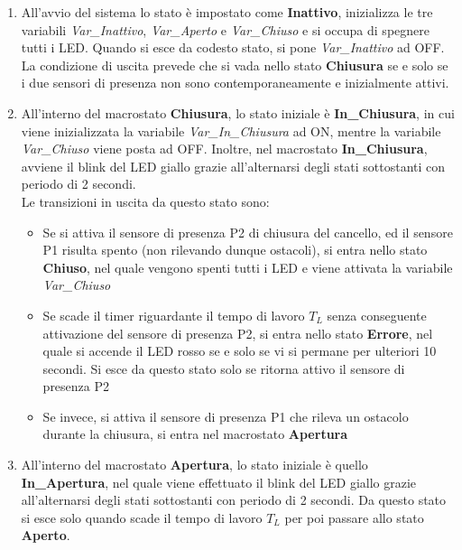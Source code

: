             \begin{enumerate}
                \item All'avvio del sistema lo stato è impostato come \textbf{Inattivo}, inizializza le tre variabili \textit{Var\_Inattivo}, \textit{Var\_Aperto} e \textit{Var\_Chiuso} e si occupa di spegnere tutti i LED.
                Quando si esce da codesto stato, si pone \textit{Var\_Inattivo} ad OFF.
                La condizione di uscita prevede che si vada nello stato \textbf{Chiusura} se e solo se i due sensori di presenza non sono contemporaneamente e inizialmente attivi.
                
                \item All'interno del macrostato \textbf{Chiusura}, lo stato iniziale è \textbf{In\_Chiusura}, in cui viene inizializzata la variabile \textit{Var\_In\_Chiusura} ad ON, mentre la variabile \textit{Var\_Chiuso} viene posta ad OFF.
                Inoltre, nel macrostato \textbf{In\_Chiusura}, avviene il blink del LED giallo grazie all'alternarsi degli stati sottostanti con periodo di 2 secondi. \\
                Le transizioni in uscita da questo stato sono:
            
                \begin{itemize}
                    \item Se si attiva il sensore di presenza P2 di chiusura del cancello, ed il sensore P1 risulta spento (non rilevando dunque ostacoli), si entra nello stato \textbf{Chiuso}, nel quale vengono spenti tutti i LED e viene attivata la variabile \textit{Var\_Chiuso}
                    
                    \item Se scade il timer riguardante il tempo di lavoro \textbf{$T_L$} senza conseguente attivazione del sensore di presenza P2, si entra nello stato \textbf{Errore}, nel quale si accende il LED rosso se e solo se vi si permane  per ulteriori 10 secondi. Si esce da questo stato solo se ritorna attivo il sensore di presenza P2
                    
                    \item Se invece, si attiva il sensore di presenza P1 che rileva un ostacolo durante la chiusura, si entra nel macrostato \textbf{Apertura}
                \end{itemize}
            
                \item All'interno del macrostato \textbf{Apertura}, lo stato iniziale è quello \textbf{In\_Apertura}, nel quale viene effettuato il blink del LED giallo grazie all'alternarsi degli stati sottostanti con periodo di 2 secondi.
                Da questo stato si esce solo quando scade il tempo di lavoro \textbf{$T_L$} per poi passare allo stato \textbf{Aperto}.
                

\end{enumerate}
